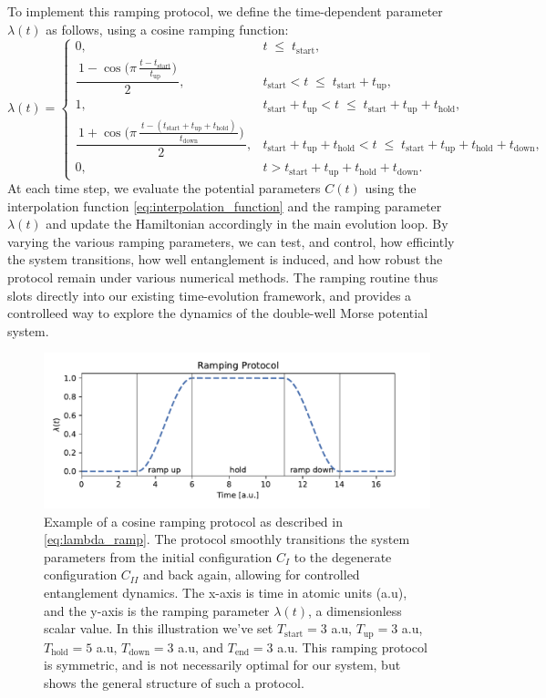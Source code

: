 \documentclass{subfiles}
\begin{document}
To implement this ramping protocol, we define the time-dependent parameter $\lambda(t)$ as follows, using a cosine ramping function:
\begin{equation*}
\lambda(t)=
\begin{cases}
0,
&
t \;\le\;
t_{\mathrm{start}},
\\[6pt]
\dfrac{\,1-\cos\!\bigl(\pi\,\tfrac{t - t_{\mathrm{start}}}{t_{\mathrm{up}}}\bigr)\,}{2},
&
t_{\mathrm{start}} < t \;\le\; t_{\mathrm{start}} + t_{\mathrm{up}},
\\[8pt]
1,
&
t_{\mathrm{start}} + t_{\mathrm{up}} < t \;\le\;
t_{\mathrm{start}} + t_{\mathrm{up}} + t_{\mathrm{hold}},
\\[6pt]
\dfrac{\,1+\cos\!\bigl(\pi\,\tfrac{\,t - (t_{\mathrm{start}}+t_{\mathrm{up}}+t_{\mathrm{hold}})\,}{t_{\mathrm{down}}}\bigr)\,}{2},
&
t_{\mathrm{start}} + t_{\mathrm{up}} + t_{\mathrm{hold}}
< t \;\le\;
t_{\mathrm{start}} + t_{\mathrm{up}} + t_{\mathrm{hold}} + t_{\mathrm{down}},
\\[6pt]
0,
&
t > t_{\mathrm{start}} + t_{\mathrm{up}} + t_{\mathrm{hold}} + t_{\mathrm{down}}.
\end{cases}
\label{eq:lambda_ramp}
\end{equation*}
At each time step, we evaluate the potential parameters $C(t)$ using the interpolation function \eqref{eq:interpolation_function} and the ramping parameter $\lambda(t)$ and update the Hamiltonian accordingly in the main evolution loop. By varying the various ramping parameters, we can test, and control, how efficintly the system transitions, how well entanglement is induced, and how robust the protocol remain under various numerical methods. The ramping routine thus slots directly into our existing time-evolution framework, and provides a controlleed way to explore the dynamics of the double-well Morse potential system.
\begin{figure}[h!]
    \centering
    \includegraphics[width=1.0\textwidth]{figs/ramp_protocol.pdf}
    \caption{Example of a cosine ramping protocol as described in \eqref{eq:lambda_ramp}. The protocol smoothly transitions the system parameters from the initial configuration $C_I$ to the degenerate configuration $C_{II}$ and back again, allowing for controlled entanglement dynamics. The x-axis is time in atomic units (a.u), and the y-axis is the ramping parameter $\lambda(t)$, a dimensionless scalar value. In this illustration we've set $T_{\mathrm{start}} = 3$ a.u, $T_{\mathrm{up}} = 3$ a.u, $T_{\mathrm{hold}} = 5$ a.u, $T_{\mathrm{down}} = 3$ a.u, and $T_{\mathrm{end}} = 3$ a.u. This ramping protocol is symmetric, and is not necessarily optimal for our system, but shows the general structure of such a protocol.}
\end{figure}
\end{document}

